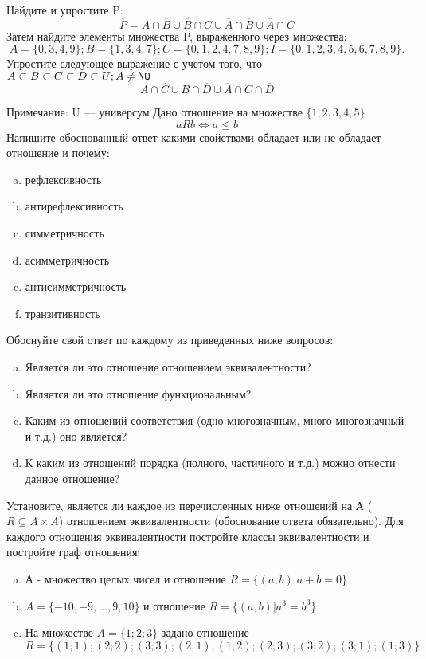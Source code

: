 \documentclass[10pt]{exam}
\begin{document}
\begin{questions}
\question
Найдите и упростите P:
\begin{equation*}
\overline{P} = A \cap \overline{B} \cup \overline{B} \cap C \cup \overline{A} \cap \overline{B} \cup \overline{A} \cap C
\end{equation*}
Затем найдите элементы множества P, выраженного через множества:
\begin{equation*}
A = \{0, 3, 4, 9\}; 
B = \{1, 3, 4, 7\};
C = \{0, 1, 2, 4, 7, 8, 9\};
I = \{0, 1, 2, 3, 4, 5, 6, 7, 8, 9\}.
\end{equation*}\question
Упростите следующее выражение с учетом того, что $A\subset B \subset C \subset D \subset U; A \neq \O$
\begin{equation*}
A \cap  \overline{C} \cup B \cap \overline{D} \cup  \overline{A} \cap C \cap  \overline{D}
\end{equation*}

Примечание: U — универсум\question
Дано отношение на множестве $\{1, 2, 3, 4, 5\}$ 
\begin{equation*}
aRb \iff a \leq b
\end{equation*}
Напишите обоснованный ответ какими свойствами обладает или не обладает отношение и почему:   
\begin{enumerate} [a)]\setcounter{enumi}{0}
\item рефлексивность
\item антирефлексивность
\item симметричность
\item асимметричность
\item антисимметричность
\item транзитивность
\end{enumerate}

Обоснуйте свой ответ по каждому из приведенных ниже вопросов:
\begin{enumerate} [a)]\setcounter{enumi}{0}
    \item Является ли это отношение отношением эквивалентности?
    \item Является ли это отношение функциональным?
    \item Каким из отношений соответствия (одно-многозначным, много-многозначный и т.д.) оно является?
    \item К каким из отношений порядка (полного, частичного и т.д.) можно отнести данное отношение?
\end{enumerate}


\question
Установите, является ли каждое из перечисленных ниже отношений на А ($R \subseteq A \times A$) отношением эквивалентности (обоснование ответа обязательно). Для каждого отношения эквивалентности 
постройте классы эквивалентности и постройте граф отношения:
\begin{enumerate}[a)]\setcounter{enumi}{0}
\item А - множество целых чисел и отношение $R = \{(a,b)|a + b = 0\}$
\item $A = \{-10, -9, …, 9, 10\}$ и отношение $R = \{(a,b)|a^{3} = b^{3}\}$
\item На множестве $A = \{1; 2; 3\}$ задано отношение $R = \{(1; 1); (2; 2); (3; 3); (2; 1); (1; 2); (2; 3); (3; 2); (3; 1); (1; 3)\}$


\end{enumerate}
\end{questions}
\end{document}

